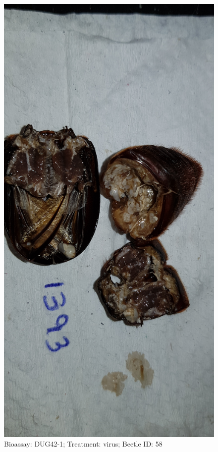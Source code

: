 \documentclass[11pt]{scrartcl}
\begin{document}
\begin{figure}[h!]
    \centering
    \includegraphics[width=\linewidth, height=\textheight, keepaspectratio]{uploads/btl.pm_image.80a417bc99ec8482.447567343220313339335f5265702d312076697275732e6a7067.jpg}
    \caption{Bioassay: DUG42-1; Treatment: virus; Beetle ID: 58}
\end{figure}
\clearpage
\end{document}
